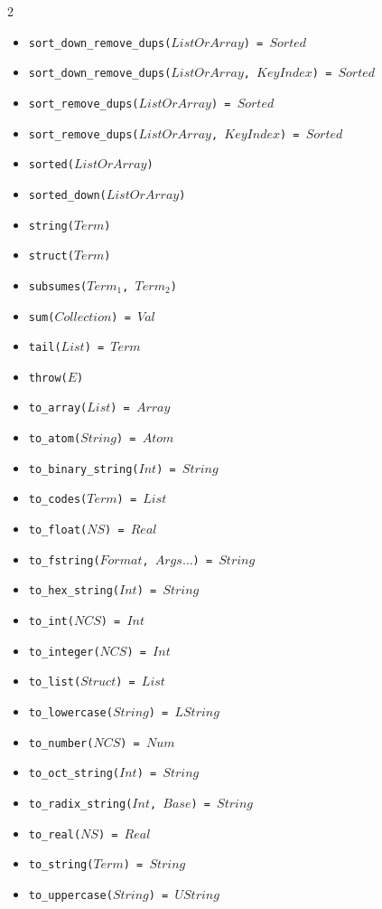 \documentclass[10pt]{article}
\begin{document}
\begin{multicols}{2}
\begin{scriptsize}
\begin{itemize}
    \item \texttt{sort\_down\_remove\_dups($ListOrArray$) = $Sorted$} 
    \item \texttt{sort\_down\_remove\_dups($ListOrArray$, $KeyIndex$) = $Sorted$} 
    \item \texttt{sort\_remove\_dups($ListOrArray$) = $Sorted$} 
    \item \texttt{sort\_remove\_dups($ListOrArray$, $KeyIndex$) = $Sorted$} 
    \item \texttt{sorted($ListOrArray$)} 
    \item \texttt{sorted\_down($ListOrArray$)} 
    \item \texttt{string($Term$)} 
    \item \texttt{struct($Term$)} 
    \item \texttt{subsumes($Term_1$, $Term_2$)}
    \item \texttt{sum($Collection$) = $Val$}
    \item \texttt{tail($List$) = $Term$} 
    \item \texttt{throw($E$)}    
    \item \texttt{to\_array($List$) = $Array$} 
    \item \texttt{to\_atom($String$) = $Atom$} 
    \item \texttt{to\_binary\_string($Int$) = $String$}
    \item \texttt{to\_codes($Term$) = $List$}    
    \item \texttt{to\_float($NS$) = $Real$}     
    \item \texttt{to\_fstring($Format$, $Args\ldots$) = $String$}
    \item \texttt{to\_hex\_string($Int$) = $String$}    
    \item \texttt{to\_int($NCS$) = $Int$} 
    \item \texttt{to\_integer($NCS$) = $Int$} 
    \item \texttt{to\_list($Struct$) = $List$} 
    \item \texttt{to\_lowercase($String$) = $LString$}
    \item \texttt{to\_number($NCS$) = $Num$}
    \item \texttt{to\_oct\_string($Int$) = $String$}    
    \item \texttt{to\_radix\_string($Int$, $Base$) = $String$}
    \item \texttt{to\_real($NS$) = $Real$} 
    \item \texttt{to\_string($Term$) = $String$}        
    \item \texttt{to\_uppercase($String$) = $UString$}

\end{itemize}
\end{scriptsize}
\end{multicols}
\end{document}
